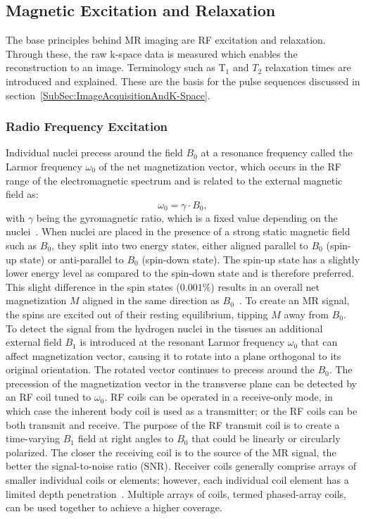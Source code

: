 \subsection{Magnetic Excitation and Relaxation} \label{SubSec:MagneticExcitationAndRelaxation}
The base principles behind MR imaging are RF excitation and relaxation. Through these, the raw k-space data is measured which enables the reconstruction to an image. Terminology such as $\text{T}_1$ and $T_2$ relaxation times are introduced and explained. These are the basis for the pulse sequences discussed in section~\ref{SubSec:ImageAcquisitionAndK-Space}.

\subsubsection{Radio Frequency Excitation}
Individual nuclei precess around the field $B_0$ at a
resonance frequency called the Larmor frequency $\omega_0$ of the net magnetization vector, which occurs in the RF range of the electromagnetic spectrum and is related to the external magnetic field as:
\begin{equation} \label{eq:LarmorFrequency}
	\omega_0 = \gamma \cdot B_0,
\end{equation}
with $\gamma$ being the gyromagnetic ratio, which is a fixed value depending on the nuclei~\cite{SamplingStrategies}. When nuclei are placed in the presence of a strong static magnetic field such as $B_0$, they split into two energy states, either aligned parallel to $B_0$ (spin-up state) or anti-parallel to $B_0$ (spin-down state). The spin-up state has a slightly lower energy level as compared to the spin-down state and is therefore preferred. This slight difference in the spin states ($0.001\%$) results in an overall net magnetization $M$ aligned in the same direction as $B_0$~\cite{Serai2021}. To create an MR signal, the spins are excited out of their resting equilibrium, tipping $M$ away from $B_0$. To detect the signal from the hydrogen nuclei in the tissues an additional external field $B_1$ is introduced at the resonant Larmor frequency $\omega_0$ that can affect magnetization vector, causing it to rotate into a plane orthogonal to its original orientation. The rotated vector continues to precess around the $B_0$. The precession of the magnetization vector in the transverse plane can be detected by an RF coil tuned to $\omega_0$. RF coils can be operated in a receive-only mode, in which case the inherent body coil is used as a transmitter; or the RF coils can be both transmit and receive. The purpose of the RF transmit coil is to create a time-varying $B_1$ field at right angles to $B_0$ that could be linearly or circularly polarized. The closer the receiving coil is to the source of the MR signal, the better the signal-to-noise ratio (SNR). Receiver coils generally comprise arrays of smaller individual coils or elements; however, each individual coil element has a limited depth penetration~\cite{Serai2021}. Multiple arrays of coils, termed phased-array coils, can be used together to achieve a higher coverage. 
